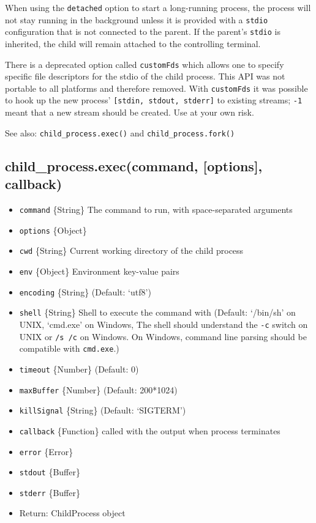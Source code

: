 When using the \texttt{detached} option to start a long-running process,
the process will not stay running in the background unless it is
provided with a \texttt{stdio} configuration that is not connected to
the parent. If the parent's \texttt{stdio} is inherited, the child will
remain attached to the controlling terminal.

There is a deprecated option called \texttt{customFds} which allows one
to specify specific file descriptors for the stdio of the child process.
This API was not portable to all platforms and therefore removed. With
\texttt{customFds} it was possible to hook up the new process'
\texttt{{[}stdin, stdout, stderr{]}} to existing streams; \texttt{-1}
meant that a new stream should be created. Use at your own risk.

See also: \texttt{child\_process.exec()} and
\texttt{child\_process.fork()}

\subsection{child\_process.exec(command, {[}options{]}, callback)}

\begin{itemize}
\item
  \texttt{command} \{String\} The command to run, with space-separated
  arguments
\item
  \texttt{options} \{Object\}
\item
  \texttt{cwd} \{String\} Current working directory of the child process
\item
  \texttt{env} \{Object\} Environment key-value pairs
\item
  \texttt{encoding} \{String\} (Default: `utf8')
\item
  \texttt{shell} \{String\} Shell to execute the command with (Default:
  `/bin/sh' on UNIX, `cmd.exe' on Windows, The shell should understand
  the \texttt{-c} switch on UNIX or \texttt{/s /c} on Windows. On
  Windows, command line parsing should be compatible with
  \texttt{cmd.exe}.)
\item
  \texttt{timeout} \{Number\} (Default: 0)
\item
  \texttt{maxBuffer} \{Number\} (Default: 200*1024)
\item
  \texttt{killSignal} \{String\} (Default: `SIGTERM')
\item
  \texttt{callback} \{Function\} called with the output when process
  terminates
\item
  \texttt{error} \{Error\}
\item
  \texttt{stdout} \{Buffer\}
\item
  \texttt{stderr} \{Buffer\}
\item
  Return: ChildProcess object
\end{itemize}

